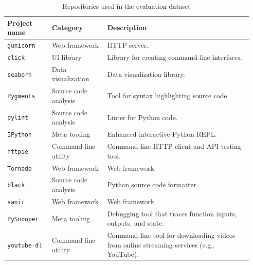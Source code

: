 \begin{table}[H]
      \centering
      \caption{Repositories used in the evaluation dataset}
      \label{tab:eval_repositories}
      \renewcommand{\arraystretch}{1.2}
      \begin{tabular}{@{} l l p{8.5cm} @{}}
            \toprule
            \textbf{Project name} & \textbf{Category}    & \textbf{Description}
            \\ \midrule
            \verb|gunicorn|       & Web framework        & HTTP server.
            \\
            \verb|click|          & UI library           & Library for creating command-line interfaces.
            \\
            \verb|seaborn|        & Data visualization   & Data visualization library.
            \\
            \verb|Pygments|       & Source code analysis & Tool for syntax highlighting source code.
            \\
            \verb|pylint|         & Source code analysis & Linter for Python code.
            \\
            \verb|IPython|        & Meta tooling         & Enhanced interactive Python REPL.
            \\
            \verb|httpie|         & Command-line utility & Command-line HTTP client and API testing tool.
            \\
            \verb|Tornado|        & Web framework        & Web framework.
            \\
            \verb|black|          & Source code analysis & Python source code formatter.
            \\
            \verb|sanic|          & Web framework        & Web framework.
            \\
            \verb|PySnooper|      & Meta tooling         & Debugging tool that traces function inputs, outputs, and
            state.                                                                                                  \\
            \verb|youtube-dl|     & Command-line utility & Command-line tool for downloading videos from online
            streaming services (e.g., YouTube).                                                                     \\
            \bottomrule
      \end{tabular}
\end{table}

